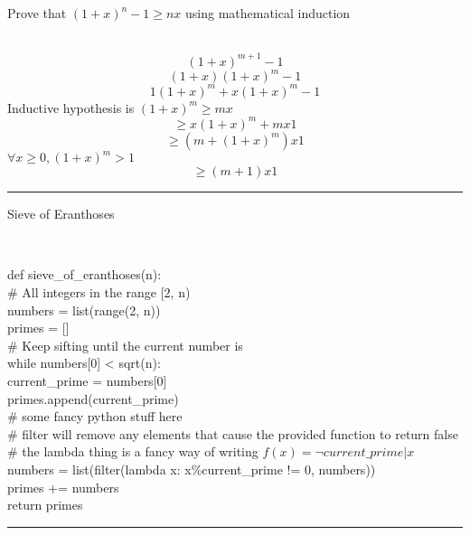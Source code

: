 \documentclass[11pt]{article}
\begin{document}
Prove that $(1+x)^n-1\geq nx$ using mathematical induction
\begin{solution} \hfill \\
    $$(1+x)^{m+1} - 1$$
    $$(1+x)(1+x)^m -1$$
    $$1(1+x)^m+x(1+x)^m -1$$
    Inductive hypothesis is $(1+x)^m \geq mx$\\
    $$\geq x(1+x)^m+mx1$$
    $$\geq (m+(1+x)^m)x1$$
    $\forall x \geq 0, (1+x)^m > 1$
    $$\geq (m+1)x1$$
\end{solution}
\vspace{6pt}
\hrule
\vspace{6pt}

Sieve of Eranthoses 
\begin{solution} \hfill \\
    \begin{algo}
    def sieve\_of\_eranthoses(n):\+
    \\  \# All integers in the range [2, n)
    \\  numbers = list(range(2, n))
    \\  primes = []
    \\  \# Keep sifting until the current number is \geq {}
    \\  while numbers[0] < sqrt(n):\+
    \\      current\_prime = numbers[0]
    \\      primes.append(current\_prime)
    \\      \# some fancy python stuff here
    \\      \# filter will remove any elements that cause the provided function to return false
    \\      \# the lambda thing is a fancy way of writing $f(x) = \neg current\_prime|x$
    \\      numbers = list(filter(lambda x: x\%current\_prime != 0, numbers))\-
    \\  primes += numbers
    \\  return primes
    \end{algo}
\end{solution}
\vspace{6pt}
\hrule
\vspace{6pt}
\end{document}
